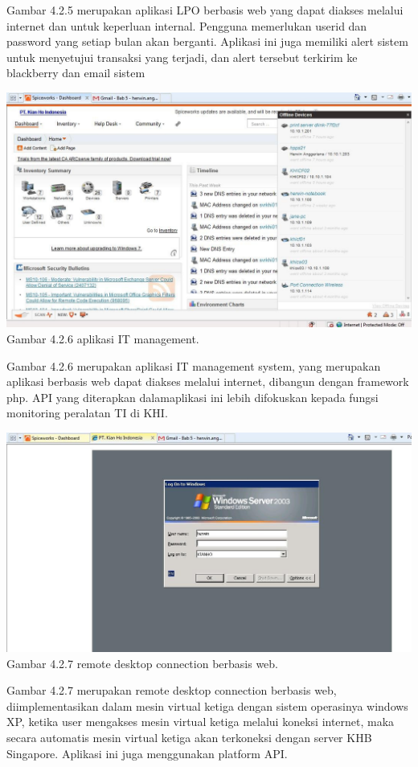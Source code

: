 Gambar 4.2.5 merupakan aplikasi LPO berbasis web yang dapat diakses melalui internet dan untuk keperluan internal. Pengguna memerlukan userid dan password yang setiap bulan akan berganti. Aplikasi ini juga memiliki alert sistem untuk menyetujui transaksi yang terjadi, dan alert tersebut terkirim ke blackberry dan email sistem
\begin{center}
\includegraphics[scale=0.5]{gambar426.jpg} \\
Gambar 4.2.6 aplikasi IT management.
\end{center}
Gambar 4.2.6 merupakan aplikasi IT management system, yang merupakan aplikasi berbasis web dapat diakses melalui internet, dibangun dengan framework php. API yang diterapkan dalamaplikasi ini lebih difokuskan kepada fungsi  monitoring peralatan TI di KHI.
\begin{center}
\includegraphics[scale=0.5]{gambar427.jpg} \\
Gambar 4.2.7 remote desktop connection berbasis web.
\end{center}
Gambar 4.2.7 merupakan remote desktop connection berbasis web, diimplementasikan dalam mesin virtual ketiga dengan sistem operasinya windows XP, ketika user  mengakses  mesin virtual ketiga melalui koneksi internet, maka secara automatis mesin virtual ketiga  akan terkoneksi dengan server KHB Singapore.  Aplikasi ini juga menggunakan platform API.\\

